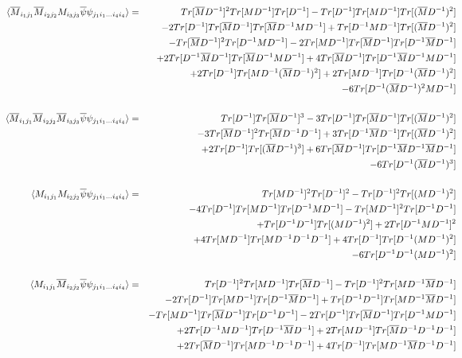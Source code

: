 \documentclass[a4paper,10pt]{report}
\newcommand{\ol}[1]{\overline{#1}}
\newcommand{\Mb}{\ol{M}}
\newcommand{\mv}[1]{\langle #1 \rangle}
\newcommand{\ppb}{\ol{\psi}\psi}
\newcommand{\D}{D^{-1}}
\begin{document}
\begin{eqnarray}
\nonumber\\
\hspace*{-19mm}\mv{\Mb_{i_1j_1}\Mb_{i_2j_2}M_{i_3j_3} \ppb_{j_1i_1...i_4i_4}} &=&
Tr[\Mb\D]^2Tr[M\D]Tr[\D] - Tr[\D]Tr[M\D]Tr[(\Mb\D)^2]\nonumber\\
&& - 2 Tr[\D]Tr[\Mb\D]Tr[\Mb\D M\D]  + Tr[\D M\D]Tr[(\Mb\D)^2]\nonumber\\
&& - Tr[\Mb\D]^2Tr[\D M\D] - 2 Tr[M\D]Tr[\Mb\D]Tr[\D \Mb\D]\nonumber\\
&& + 2 Tr[\D \Mb \D] Tr[\Mb\D M \D] +  4 Tr[\Mb\D] Tr[\D \Mb\D M\D] \nonumber\\
&& + 2 Tr[\D]Tr[M\D(\Mb\D)^2] + 2 Tr[M\D]Tr[\D(\Mb\D)^2]\nonumber\\
&& - 6 Tr[\D(\Mb\D)^2M\D]\nonumber\\
\nonumber\\
\hspace*{-19mm}\mv{\Mb_{i_1j_1}\Mb_{i_2j_2}\Mb_{i_3j_3} \ppb_{j_1i_1...i_4i_4}} &=&
Tr[\D]Tr[\Mb\D]^3 - 3 Tr[\D]Tr[\Mb\D]Tr[(\Mb\D)^2] \nonumber\\
&& - 3 Tr[\Mb\D]^2Tr[\Mb\D\D] + 3 Tr[\D \Mb\D]Tr[(\Mb\D)^2] \nonumber\\
&& + 2 Tr[\D]Tr[(\Mb\D)^3] + 6 Tr[\Mb\D]Tr[\D \Mb\D \Mb\D] \nonumber\\
&& - 6 Tr[\D(\Mb\D)^3]\nonumber\\
\nonumber\\
%
\hspace*{-19mm}\mv{M_{i_1j_1}M_{i_2j_2} \ppb_{j_1i_1...i_4i_4}} &=&
Tr[M\D]^2 Tr[\D]^2 - Tr[\D]^2 Tr[(M\D)^2] \nonumber\\
&& - 4 Tr[\D]Tr[M\D]Tr[\D M\D] - Tr[M\D]^2 Tr[\D\D] \nonumber\\
&& + Tr[\D\D]Tr[(M\D)^2] + 2 Tr[\D M\D]^2\nonumber\\
&&   + 4 Tr[M\D]Tr[M\D\D\D] + 4 Tr[\D]Tr[\D(M\D)^2]\nonumber \\
&& - 6 Tr[\D\D(M\D)^2]\nonumber\\
\nonumber\\
\hspace*{-19mm}\mv{M_{i_1j_1}\Mb_{i_2j_2} \ppb_{j_1i_1...i_4i_4}} &=&
Tr[\D]^2Tr[M\D]Tr[\Mb\D] - Tr[\D]^2Tr[M\D\Mb\D]\nonumber\\
&&- 2 Tr[\D]Tr[M\D]Tr[\D\Mb\D] + Tr[\D\D]Tr[M\D\Mb\D] \nonumber\\
&&- Tr[M\D]Tr[\Mb\D]Tr[\D\D] - 2 Tr[\D]Tr[\Mb\D]Tr[\D M \D]\nonumber\\
&& + 2 Tr[\D M\D]Tr[\D\Mb\D] + 2 Tr[M\D]Tr[\Mb\D\D\D]\nonumber\\
&& + 2 Tr[\Mb\D]Tr[M\D\D\D] + 4 Tr[\D]Tr[M\D\Mb\D\D]\nonumber\\

\end{eqnarray}
\end{document}

